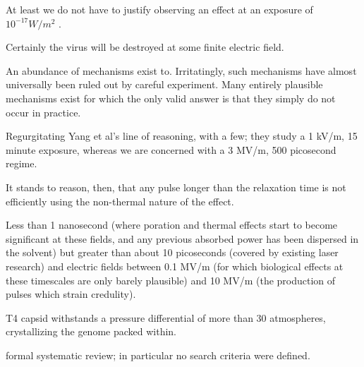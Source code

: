 \documentclass[paper.tex]{subfiles}
\begin{document}
\begin{multicols}{1}
At least we do not have to justify observing an effect at an exposure of $10^{-17} W/m^2$ \cite{Resonance1996}.

Certainly the virus will be destroyed at some finite electric field.






%
\clearpage 

An abundance of mechanisms exist to. Irritatingly, such mechanisms have almost universally been ruled out by careful experiment. Many entirely plausible mechanisms exist for which the only valid answer is that they simply do not occur in practice.

%
%

Regurgitating Yang et al's line of reasoning, with a few; they study a 1 kV/m, 15 minute exposure, whereas we are concerned with a 3 MV/m, 500 picosecond regime. 



It stands to reason, then, that any pulse longer than the relaxation time is not efficiently using the non-thermal nature of the effect.

Less than 1 nanosecond (where poration and thermal effects start to become significant at these fields, and any previous absorbed power has been dispersed in the solvent) but greater than about 10 picoseconds (covered by existing laser research) and electric fields between 0.1 MV/m (for which biological effects at these timescales are only barely plausible) and 10 MV/m (the production of pulses which strain credulity).






T4 capsid withstands a pressure differential of more than 30 atmospheres, crystallizing the genome packed within. \cite{Osmotic2003}


formal systematic review; in particular no search criteria were defined.


\end{multicols}
\end{document}
